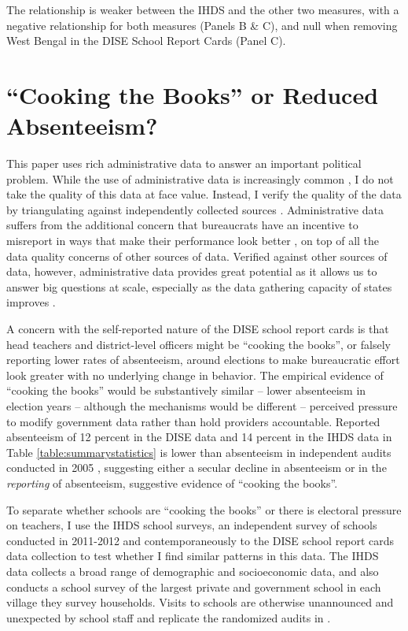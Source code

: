 \documentclass[hidelinks, 12pt, article, oneside]{memoir}
\begin{document}
The relationship is weaker between the IHDS and the other two measures, with a negative relationship for both measures (Panels B \& C), and null when removing West Bengal in the DISE School Report Cards (Panel C).

\clearpage

\section{``Cooking the Books'' or Reduced Absenteeism?}\label{appendixsection:ihdsdata}

This paper uses rich administrative data to answer an important political problem.  While the use of administrative data is increasingly common \citep{Lindgren2016, Gulzar2017}, I do not take the quality of this data at face value. Instead, I verify the quality of the data by triangulating against independently collected sources \citep{Herrera2007}.  Administrative data suffers from the additional concern that bureaucrats have an incentive to misreport in ways that make their performance look better \citep{Martinez2022}, on top of all the data quality concerns of other sources of data.  Verified against other sources of data, however, administrative data provides great potential as it allows us to answer big questions at scale, especially as the data gathering capacity of states improves \citep{Jerven2013, Jensenius2017}.

A concern with the self-reported nature of the DISE school report cards is that head teachers and district-level officers might be ``cooking the books'', or falsely reporting lower rates of absenteeism, around elections to make bureaucratic effort look greater with no underlying change in behavior.  The empirical evidence of ``cooking the books'' would be substantively similar -- lower absenteeism in election years -- although the mechanisms would be different -- perceived pressure to modify government data rather than hold providers accountable. Reported absenteeism of 12 percent in the DISE data and 14 percent in the IHDS data in Table \ref{table:summarystatistics} is lower than absenteeism in independent audits conducted in 2005 \citep{Chaudhury2006, Muralidharan2016}, suggesting either a secular decline in absenteeism or in the \emph{reporting} of absenteeism, suggestive evidence of ``cooking the books''.

To separate whether schools are ``cooking the books'' or there is electoral pressure on teachers, I use the IHDS school surveys, an independent survey of schools conducted in 2011-2012 and contemporaneously to the DISE school report cards data collection to test whether I find similar patterns in this data.  The IHDS data collects a broad range of demographic and socioeconomic data, and also conducts a school survey of the largest private and government school in each village they survey households.  Visits to schools are otherwise unannounced and unexpected by school staff and replicate the randomized audits in \cite{Chaudhury2006}.
\end{document}
